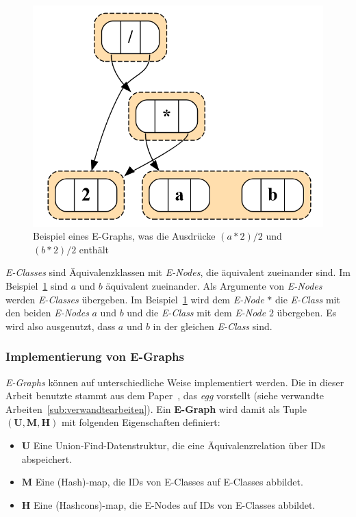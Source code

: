 \begin{figure}[H]
  \centering
  \includegraphics[scale=0.5]{../fig/egraph_exp.png}
  \caption{Beispiel eines E-Graphs, was die Ausdrücke $(a * 2) / 2$ und $(b * 2) / 2$ enthält}
  \label{fig:egraphexp}
\end{figure}

\textit{E-Classes} sind Äquivalenzklassen mit \textit{E-Nodes}, die äquivalent zueinander sind. Im Beispiel~\ref{fig:egraphexp} sind $a$ und $b$ äquivalent zueinander.
Als Argumente von \textit{E-Nodes} werden \textit{E-Classes} übergeben. Im Beispiel~\ref{fig:egraphexp} wird dem \textit{E-Node} $*$ die \textit{E-Class} mit den beiden 
\textit{E-Nodes} $a$ und $b$ und die \textit{E-Class} mit dem \textit{E-Node} $2$ übergeben. Es wird also ausgenutzt, dass $a$ und $b$ in der gleichen \textit{E-Class}
sind. 

\subsubsection{Implementierung von E-Graphs}

\textit{E-Graphs} können auf unterschiedliche Weise implementiert werden. Die in dieser Arbeit benutzte stammt aus dem Paper~\cite{2021-egg}, das \textit{egg} vorstellt 
(siehe verwandte Arbeiten~\ref{sub:verwandtearbeiten}). Ein \textbf{E-Graph} wird damit als Tuple $(\mathbf{U}, \mathbf{M}, \mathbf{H})$ mit folgenden Eigenschaften definiert:

\begin{itemize}
  \item $\mathbf{U}$ Eine Union-Find-Datenstruktur, die eine Äquivalenzrelation über IDs abspeichert.
  \item $\mathbf{M}$ Eine (Hash)-map, die IDs von E-Classes auf E-Classes abbildet. 
  \item $\mathbf{H}$ Eine (Hashcons)-map, die E-Nodes auf IDs von E-Classes abbildet.
\end{itemize}

